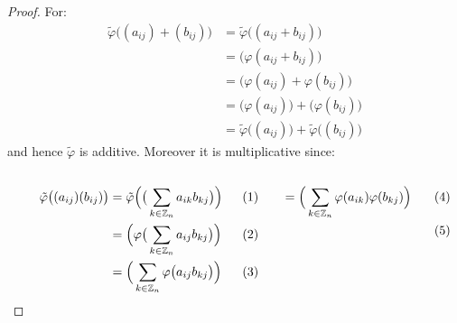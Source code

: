 \documentclass{book}                                                           %
\begin{document}
            \begin{proof}
                For:
                \begin{subequations}
                    \begin{align}
                        \tilde{\varphi}\big((a_{ij})+(b_{ij})\big)
                        &=\tilde{\varphi}\big((a_{ij}+b_{ij})\big)\\
                        &=\big(\varphi(a_{ij}+b_{ij})\big)\\
                        &=\big(\varphi(a_{ij})+\varphi(b_{ij})\big)\\
                        &=\big(\varphi(a_{ij})\big)
                            +\big(\varphi(b_{ij})\big)\\
                        &=\tilde{\varphi}\big((a_{ij})\big)+
                            \tilde{\varphi}\big((b_{ij})\big)
                    \end{align}
                \end{subequations}
                and hence $\tilde{\varphi}$ is additive. Moreover it is
                multiplicative since:
                \par
                \begin{subequations}
                    \begin{minipage}[t]{0.55\textwidth}
                        \centering
                        \begin{align}
                            \tilde{\varphi}\big((a_{ij})(b_{ij})\big)
                            &=\tilde{\varphi}\Big(
                                \big(\sum_{k\in\mathbb{Z}_{n}}
                                    a_{ik}b_{kj}\big)
                            \Big)\\
                            &=\Big(\varphi\big(
                                \sum_{k\in\mathbb{Z}_{n}}a_{ij}b_{kj}\big)
                                \Big)\\
                            &=\Big(\sum_{k\in\mathbb{Z}_{n}}
                                \varphi\big(a_{ij}b_{kj}\big)\Big)
                        \end{align}
                    \end{minipage}
                    \hfill
                    \begin{minipage}[t]{0.44\textwidth}
                        \centering
                        \begin{align}
                            &=\Big(\sum_{k\in\mathbb{Z}_{n}}
                                \varphi(a_{ik})\varphi(b_{kj})\Big)\\

\end{align}
\end{minipage}
\end{subequations}
\end{proof}
\end{document}
